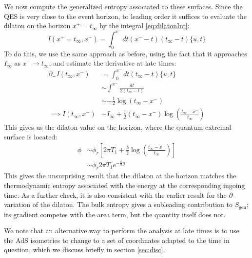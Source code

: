 \documentclass[12pt]{article}
\begin{document}
We now compute the generalized entropy associated to these surfaces. Since the QES is very close to the event horizon, to leading order it suffices to evaluate the dilaton on the horizon $x^+=t_\infty$ by the integral \eqref{eq:dilatonInt}:
\begin{equation}
	I(x^+=t_\infty, x^-) = \int_0^{x^-} dt (x^--t)(t_\infty -t) \{u,t\}
\end{equation}
To do this, we use the same approach as before, using the fact that it approaches $I_\infty$ as $x^-\to t_\infty$, and estimate the derivative at late times:
\begin{align*}
	\partial_- I(t_\infty,x^-) &= \int_0^{x^-} dt (t_\infty-t)\{u,t\} \\
	& \sim \int^{x^-} \frac{dt}{2(t_\infty -t)}\\
	&\sim -\tfrac{1}{2} \log(t_\infty -x^-) \\
	\implies  I(t_\infty,x^-) &\sim I_\infty +\tfrac{1}{2}(t_\infty-x^-) \log\left(\frac{t_\infty -x^-}{t_\infty}\right)
\end{align*}
This gives us the dilaton value on the horizon, where the quantum extremal surface is located:
\begin{align}
	\phi &\sim \bar{\phi}_r \left[2\pi T_1 + \tfrac{k}{2}\log\left(\frac{t_\infty -x^-}{t_\infty}\right)\right] \\
	&\sim \bar{\phi}_r  2\pi T_1 e^{-\frac{k}{2}y^-}
\end{align}
This gives the unsurprising result that the dilaton at the horizon matches the thermodynamic entropy associated with the energy at the corresponding ingoing time. As a further check, it is also consistent with the earlier result for the $\partial_-$ variation of the dilaton. The bulk entropy gives a subleading contribution to $S_\text{gen}$; its gradient competes with the area term, but the quantity itself does not.

We note that an alternative way to perform the analysis at late times is to use the AdS isometries to change to a set of coordinates adapted to the time in question, which we discuss briefly in section \ref{sec:disc}.
\end{document}
